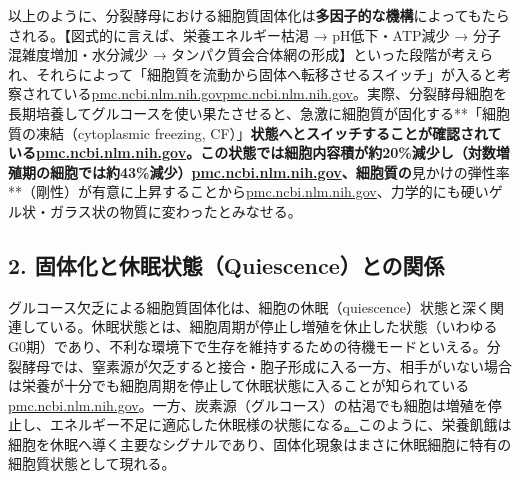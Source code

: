以上のように、分裂酵母における細胞質固体化は\textbf{多因子的な機構}によってもたらされる。【図式的に言えば、栄養エネルギー枯渇 → pH低下・ATP減少 → 分子混雑度増加・水分減少 → タンパク質会合体網の形成】といった段階が考えられ、それらによって「細胞質を流動から固体へ転移させるスイッチ」が入ると考察されている\href{https://pmc.ncbi.nlm.nih.gov/articles/PMC6857596/\#:~:text=organisation,high\%20amounts\%20of\%20carbohydrates\%2C\%20possibly}{pmc.ncbi.nlm.nih.gov}\href{https://pmc.ncbi.nlm.nih.gov/articles/PMC6857596/\#:~:text=shown\%20to\%20introduce\%20structural\%20changes,2016}{pmc.ncbi.nlm.nih.gov}。実際、分裂酵母細胞を長期培養してグルコースを使い果たさせると、急激に細胞質が固化する**「細胞質の凍結（cytoplasmic freezing, CF）」\textbf{状態へとスイッチすることが確認されている\href{https://pmc.ncbi.nlm.nih.gov/articles/PMC6857596/\#:~:text=run\%20out\%20of\%20nutrients,2016\%20\%3B\%20\%2043}{pmc.ncbi.nlm.nih.gov}。この状態では細胞内容積が約20\%減少し（対数増殖期の細胞では約43\%減少）\href{https://pmc.ncbi.nlm.nih.gov/articles/PMC6857596/\#:~:text=spherical\%20shape\%2C\%20CF\%20cells\%20slipped,Fig}{pmc.ncbi.nlm.nih.gov}、細胞質の}見かけの弾性率**（剛性）が有意に上昇することから\href{https://pmc.ncbi.nlm.nih.gov/articles/PMC4850707/\#:~:text=using\%20the\%20Hertz\%20model\%2C\%20reflects,the\%20cells\%20from\%20the\%20AFM}{pmc.ncbi.nlm.nih.gov}、力学的にも硬いゲル状・ガラス状の物質に変わったとみなせる。

\subsection{2. 固体化と休眠状態（Quiescence）との関係}

グルコース欠乏による細胞質固体化は、細胞の休眠（quiescence）状態と深く関連している。休眠状態とは、細胞周期が停止し増殖を休止した状態（いわゆるG0期）であり、不利な環境下で生存を維持するための待機モードといえる。分裂酵母では、窒素源が欠乏すると接合・胞子形成に入る一方、相手がいない場合は栄養が十分でも細胞周期を停止して休眠状態に入ることが知られている\href{https://pmc.ncbi.nlm.nih.gov/articles/PMC6857596/\#:~:text=When\%20nutrients\%20become\%20growth\%20limiting,yeast\%20cells\%20that\%20have\%20slowly}{pmc.ncbi.nlm.nih.gov}。一方、炭素源（グルコース）の枯渇でも細胞は増殖を停止し、エネルギー不足に適応した休眠様の状態になる\href{https://pmc.ncbi.nlm.nih.gov/articles/PMC3123465/\#:~:text=stochastic\%2C\%20accompanied\%20by\%20a\%20curious,choline\%29\%2C\%20which\%20increased\%20or}。このように、栄養飢餓は細胞を休眠へ導く主要なシグナルであり、固体化現象はまさに休眠細胞に特有の細胞質状態として現れる。

